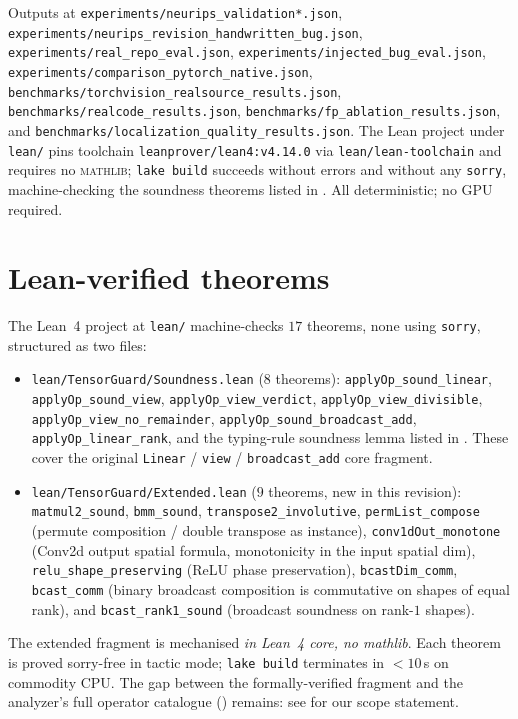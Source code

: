 \documentclass{article}
\theoremstyle{definition}
\begin{document}
Outputs at
\verb|experiments/neurips_validation*.json|,
\verb|experiments/neurips_revision_handwritten_bug.json|,
\verb|experiments/real_repo_eval.json|,
\verb|experiments/injected_bug_eval.json|,
\verb|experiments/comparison_pytorch_native.json|,
\verb|benchmarks/torchvision_realsource_results.json|,
\verb|benchmarks/realcode_results.json|,
\verb|benchmarks/fp_ablation_results.json|, and
\verb|benchmarks/localization_quality_results.json|. The Lean
project under \verb|lean/| pins toolchain
\texttt{leanprover/lean4:v4.14.0} via \verb|lean/lean-toolchain| and
requires no \textsc{mathlib}; \texttt{lake build} succeeds without
errors and without any \texttt{sorry}, machine-checking the
soundness theorems listed in . All
deterministic; no GPU required.

\section{Lean-verified theorems}\label{sec:lean-theorems}
The Lean~4 project at \verb|lean/| machine-checks
$17$ theorems, none using \texttt{sorry}, structured as two files:
\begin{itemize}\itemsep0pt
  \item \verb|lean/TensorGuard/Soundness.lean| ($8$ theorems):
    \texttt{applyOp\_sound\_linear},
    \texttt{applyOp\_sound\_view},
    \texttt{applyOp\_view\_verdict},
    \texttt{applyOp\_view\_divisible},
    \texttt{applyOp\_view\_no\_remainder},
    \texttt{applyOp\_sound\_broadcast\_add},
    \texttt{applyOp\_linear\_rank}, and the typing-rule
    soundness lemma listed in
    . These cover the
    original \texttt{Linear} / \texttt{view} /
    \texttt{broadcast\_add} core fragment.
  \item \verb|lean/TensorGuard/Extended.lean| ($9$ theorems,
    new in this revision): \texttt{matmul2\_sound},
    \texttt{bmm\_sound}, \texttt{transpose2\_involutive},
    \texttt{permList\_compose} (permute composition / double
    transpose as instance), \texttt{conv1dOut\_monotone}
    (Conv2d output spatial formula, monotonicity in the
    input spatial dim), \texttt{relu\_shape\_preserving}
    (ReLU phase preservation), \texttt{bcastDim\_comm},
    \texttt{bcast\_comm} (binary broadcast composition is
    commutative on shapes of equal rank), and
    \texttt{bcast\_rank1\_sound} (broadcast soundness on
    rank-$1$ shapes).
\end{itemize}
The extended fragment is mechanised \emph{in Lean~4 core, no
mathlib}. Each theorem is proved sorry-free in tactic mode;
\verb|lake build| terminates in $<\!10$\,s on commodity CPU. The
gap between the formally-verified fragment and the analyzer's full
operator catalogue () remains: see
 for our scope statement.
\end{document}
